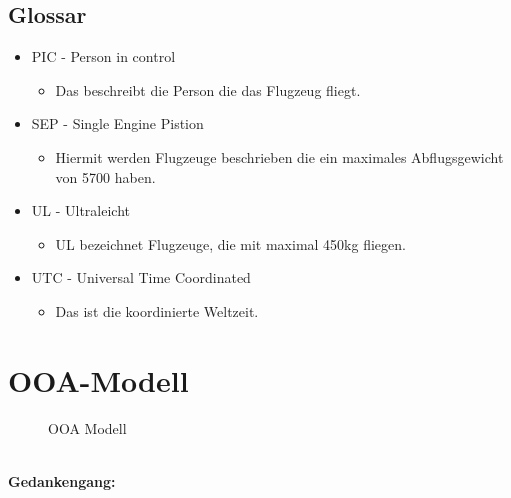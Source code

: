 \documentclass[a4paper]{article} %
\begin{document}
    \subsection{Glossar}
    \vspace{1cm}
    \begin{itemize}
    \item PIC - Person in control
    \begin{itemize}
        \item Das beschreibt die Person die das Flugzeug fliegt.
    \end{itemize}
    \item SEP - Single Engine Pistion
    \begin{itemize}
        \item Hiermit werden Flugzeuge beschrieben die ein maximales Abflugsgewicht von 5700 haben.
    \end{itemize}
    \item UL  - Ultraleicht 
    \begin{itemize}
        \item UL bezeichnet Flugzeuge, die mit maximal 450kg fliegen.
    \end{itemize}
    \item UTC - Universal Time Coordinated
    \begin{itemize}
        \item Das ist die koordinierte Weltzeit.
    \end{itemize}
    \end{itemize}
    
    \pagebreak

    \section{OOA-Modell}
    \begin{figure}[h!]
        \centering
        \caption{OOA Modell}
        \label{fig:my_label}
    \end{figure}
    \pagebreak
    \noindent\\
    \noindent \textbf{Gedankengang:}\\
    
\end{document}
